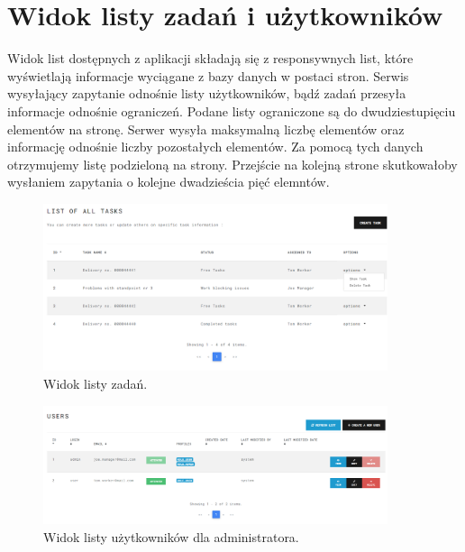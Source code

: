 \section{Widok listy zadań i użytkowników}
Widok list dostępnych z aplikacji składają się z responsywnych list, które wyświetlają informacje wyciągane z bazy danych w postaci stron. Serwis wysyłający zapytanie odnośnie listy użytkowników, bądź zadań przesyła informacje odnośnie ograniczeń. Podane listy ograniczone są do dwudziestupięciu elementów na stronę. Serwer wysyła maksymalną liczbę elementów oraz informację odnośnie liczby pozostałych elementów. Za pomocą tych danych otrzymujemy listę podzieloną na strony. Przejście na kolejną strone skutkowałoby wysłaniem zapytania o kolejne dwadzieścia pięć elemntów.
\begin{figure}[h!]
	\centering
	\includegraphics[width=0.90\textwidth]{taskslist}
	
	\caption{Widok listy zadań.}
	\label{tasklist}
\end{figure}

\begin{figure}[h!]
	\centering
	\includegraphics[width=0.90\textwidth]{users-lists}
	
	\caption{Widok listy użytkowników dla administratora.}
	\label{users-list}
\end{figure}
\clearpage

